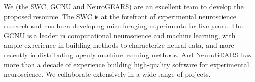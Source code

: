 We (the SWC, GCNU and NeuroGEARS) are an excellent team to develop the proposed
resource. The SWC is at the forefront of experimental neuroscience research and
has been developing mice foraging experiments for five years. The GCNU is a
leader in computational neuroscience and machine learning, with ample
experience in building methods to characterize neural data, and more recently
in distributing openly machine learning methods. And NeuroGEARS has more than a
decade of experience building high-quality software for experimental
neuroscience. We collaborate extensively in a wide range of projects.

